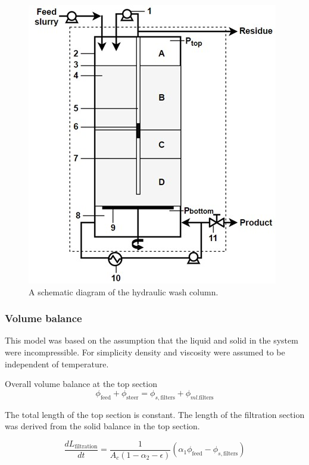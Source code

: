 \begin{figure}[h]
  \includegraphics[scale=0.5]{chapters/3-separation/figures/hydraulic.jpg}
  \caption{A schematic diagram of the hydraulic wash column.}
  \label{fig:hydraulic}
\end{figure}

\subsubsection{Volume balance} 
This model was based on the assumption that the liquid and solid in the system were incompressible. For simplicity density and viscosity were assumed to be independent of temperature. 

Overall volume balance at the top section 
\begin{equation}
\phi_{\mathrm{feed}}+\phi_{\mathrm{steer}}=\phi_{s,\mathrm{filters}}+\phi_{ml.\mathrm{filters}}
\end{equation}

The total length of the top section is constant. The length of the filtration section was derived from the solid balance in the top section. 

\begin{equation}
\frac{dL_{\mathrm{filtration}}}{dt} = \frac{1}{A_c(1-\alpha_2-\epsilon)}(\alpha_1\phi_{\mathrm{feed}}-\phi_{s,\mathrm{filters}})
\end{equation}

